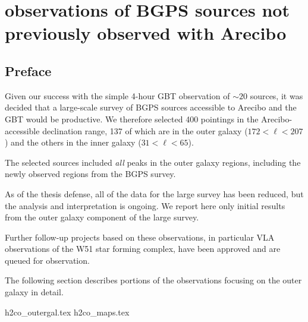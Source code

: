 
\chapter{\formaldehyde observations of BGPS sources not previously observed with Arecibo}
\label{ch:h2colarge}


\section{Preface} 

Given our success with the simple 4-hour GBT observation of $\sim20$ sources,
it was decided that a large-scale survey of BGPS sources accessible to Arecibo
and the GBT would be productive.  We therefore selected 400 pointings in the
Arecibo-accessible declination range, 137 of which are in the outer galaxy
($172<\ell<207$) and the others in the inner galaxy ($31<\ell<65$).

The selected sources included \emph{all} peaks in the outer galaxy regions,
including the newly observed regions from the BGPS \vtwo survey.

As of the thesis defense, all of the data for the large survey has been reduced,
but the analysis and interpretation is ongoing.  We report here only initial
results from the outer galaxy component of the large survey.

Further follow-up projects based on these observations, in particular VLA
observations of the W51 star forming complex, have been approved and are
queued for observation.

The following section describes portions of the \formaldehyde observations focusing
on the outer galaxy in detail.

{h2co_outergal.tex}
{h2co_maps.tex}






